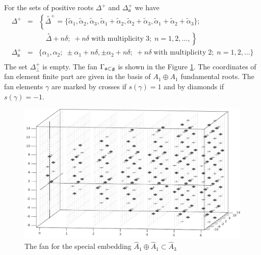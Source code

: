 \documentclass[a4paper,12pt]{article}
\theoremstyle{definition} \newtheorem{Def}{Definition}
\newcommand{\co}[1]{\overset{\circ }{#1}}
\begin{document}
For the sets of positive roots $\Delta^{+}$ and $\Delta_{\mathfrak{a}}^{+}$ we have
\begin{equation}
  \label{eq:38}
  \begin{array}{lll}
    \Delta^{+} &=&\left\{\co{\Delta}^{+}=\{\tilde{\alpha}_1, \tilde{\alpha}_2, \tilde{\alpha}_3, \tilde{\alpha}_1+\tilde{\alpha}_2, \tilde{\alpha}_2+\tilde{\alpha}_3, \tilde{\alpha}_1+\tilde{\alpha}_2+\tilde{\alpha}_3\};\right.\\
    &\; & \quad\left.\co{\Delta}+n\delta;\;     +n\delta\;\mbox{with multiplicity}\; 3;\; n=1,2,\dots,\right\}\\
    \Delta_{\mathfrak{a}}^{+} &=& \{  \alpha_1,\alpha_2;\;\pm \alpha_1+n\delta,\pm \alpha_2+n\delta;\; +n\delta\; \mbox{with multiplicity} \; 2;\; n=1,2,\dots\}\\
  \end{array}
\end{equation}
The set $\Delta^{+}_{\bot}$ is empty.
The fan $\Gamma _{\frak{a}\subset \frak{g}}$ is shown in the Figure \ref{fig:A1+A1-A3_fan}.
The coordinates of fan element finite part are given in the basis of $A_1\oplus A_1$ fundamental roots.
The fan elements $\gamma$ are marked by crosses if  $s(\gamma)=1$ and by diamonds if $s(\gamma)=-1$.
\begin{figure}[h!tb]
  \includegraphics[width=135mm]{A1+A1-A3_fan.pdf}
  \caption{The fan for the special embedding $\hat A_1\oplus\hat A_1\subset\hat A_3$}
  \label{fig:A1+A1-A3_fan}
\end{figure}
\end{document}
